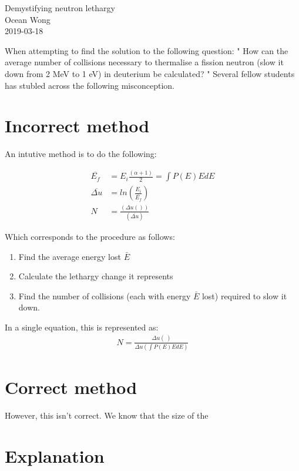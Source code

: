\documentclass[a4paper, 12pt]{article}
\begin{document}
\begin{center}
Demystifying neutron lethargy			\\
Ocean Wong								\\
2019-03-18
\end{center}

When attempting to find the solution to the following question:
"
How can the average number of collisions necessary to thermalise a fission neutron (slow
it down from 2 MeV to 1 eV) in deuterium be calculated?
"
Several fellow students has stubled across the following misconception.

\section{Incorrect method}
An intutive method is to do the following:

\begin{align}
	\overline{E_f} &= {E_i} \frac{(\alpha+1)}{2} =  \int P(E) E dE \\
	\overline{\Delta u} &= ln \left( \frac{E_i}{\overline{E_f}} \right)	\\
	N &= \frac{\left(\Delta u () \right)} {\left( \overline{\Delta u} \right)}
\end{align}

Which corresponds to the procedure as follows:
\begin{enumerate}
	\item Find the average energy lost $\bar{E}$
	\item Calculate the lethargy change it represents
	\item Find the number of collisions (each with energy $\bar{E}$ lost) required to slow it down.
\end{enumerate}

In a single equation, this is represented as:
\begin{align}
	N=\frac{\Delta u ( \frac{}{} )}{\Delta u \left(\int P(E) E dE \right) }
\end{align}

\section{Correct method}
	However, this isn't correct. We know that the size of the

\section{Explanation}
\end{document}
